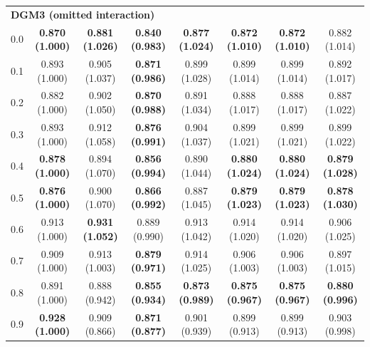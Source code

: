 \begin{table}[!h]
{\begin{tabular}[t]{|c|ccccccc|}
\hline
\multicolumn{8}{|l|}{\textbf{DGM3 (omitted interaction)}}\\
\hspace{1em}0.0 & \textbf{0.870 (1.000)} & \textbf{0.881 (1.026)} & \textbf{0.840 (0.983)} & \textbf{0.877 (1.024)} & \textbf{0.872 (1.010)} & \textbf{0.872 (1.010)} & 0.882 (1.014)\\
\hspace{1em}0.1 & 0.893 (1.000) & 0.905 (1.037) & \textbf{0.871 (0.986)} & 0.899 (1.028) & 0.899 (1.014) & 0.899 (1.014) & 0.892 (1.017)\\
\hspace{1em}0.2 & 0.882 (1.000) & 0.902 (1.050) & \textbf{0.870 (0.988)} & 0.891 (1.034) & 0.888 (1.017) & 0.888 (1.017) & 0.887 (1.022)\\
\hspace{1em}0.3 & 0.893 (1.000) & 0.912 (1.058) & \textbf{0.876 (0.991)} & 0.904 (1.037) & 0.899 (1.021) & 0.899 (1.021) & 0.899 (1.022)\\
\hspace{1em}0.4 & \textbf{0.878 (1.000)} & 0.894 (1.070) & \textbf{0.856 (0.994)} & 0.890 (1.044) & \textbf{0.880 (1.024)} & \textbf{0.880 (1.024)} & \textbf{0.879 (1.028)}\\
\hspace{1em}0.5 & \textbf{0.876 (1.000)} & 0.900 (1.070) & \textbf{0.866 (0.992)} & 0.887 (1.045) & \textbf{0.879 (1.023)} & \textbf{0.879 (1.023)} & \textbf{0.878 (1.030)}\\
\hspace{1em}0.6 & 0.913 (1.000) & \textbf{0.931 (1.052)} & 0.889 (0.990) & 0.913 (1.042) & 0.914 (1.020) & 0.914 (1.020) & 0.906 (1.025)\\
\hspace{1em}0.7 & 0.909 (1.000) & 0.913 (1.003) & \textbf{0.879 (0.971)} & 0.914 (1.025) & 0.906 (1.003) & 0.906 (1.003) & 0.897 (1.015)\\
\hspace{1em}0.8 & 0.891 (1.000) & 0.888 (0.942) & \textbf{0.855 (0.934)} & \textbf{0.873 (0.989)} & \textbf{0.875 (0.967)} & \textbf{0.875 (0.967)} & \textbf{0.880 (0.996)}\\
\hspace{1em}0.9 & \textbf{0.928 (1.000)} & 0.909 (0.866) & \textbf{0.871 (0.877)} & 0.901 (0.939) & 0.899 (0.913) & 0.899 (0.913) & 0.903 (0.998)\\
\hline
\end{tabular}}
\end{table}
